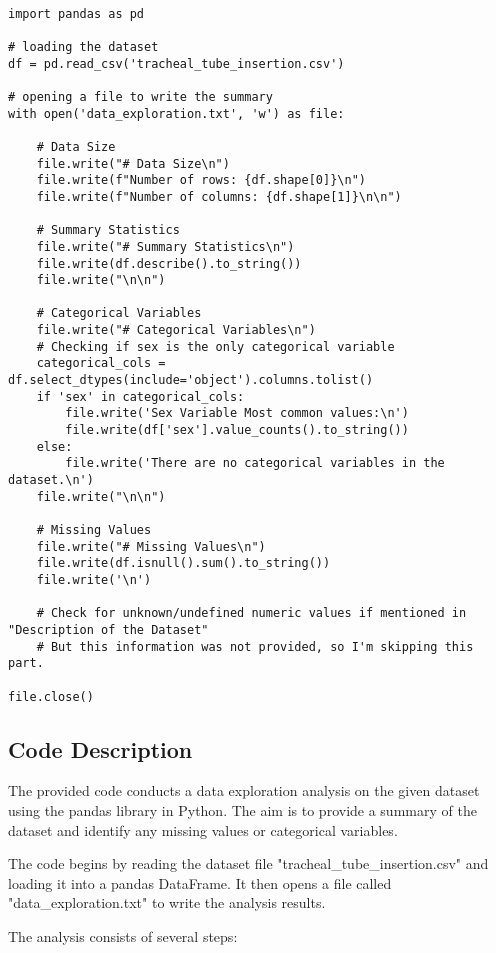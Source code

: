 \documentclass[11pt]{article}
\begin{document}
\begin{verbatim}

import pandas as pd

# loading the dataset
df = pd.read_csv('tracheal_tube_insertion.csv')

# opening a file to write the summary
with open('data_exploration.txt', 'w') as file:

    # Data Size
    file.write("# Data Size\n")
    file.write(f"Number of rows: {df.shape[0]}\n")
    file.write(f"Number of columns: {df.shape[1]}\n\n")

    # Summary Statistics
    file.write("# Summary Statistics\n")
    file.write(df.describe().to_string())
    file.write("\n\n")

    # Categorical Variables
    file.write("# Categorical Variables\n")
    # Checking if sex is the only categorical variable
    categorical_cols = df.select_dtypes(include='object').columns.tolist()
    if 'sex' in categorical_cols:
        file.write('Sex Variable Most common values:\n')
        file.write(df['sex'].value_counts().to_string())
    else: 
        file.write('There are no categorical variables in the dataset.\n')
    file.write("\n\n")
    
    # Missing Values
    file.write("# Missing Values\n")
    file.write(df.isnull().sum().to_string())
    file.write('\n')
    
    # Check for unknown/undefined numeric values if mentioned in "Description of the Dataset"
    # But this information was not provided, so I'm skipping this part.
    
file.close()

\end{verbatim}

\subsection{Code Description}

The provided code conducts a data exploration analysis on the given dataset using the pandas library in Python. The aim is to provide a summary of the dataset and identify any missing values or categorical variables.

The code begins by reading the dataset file "tracheal\_tube\_insertion.csv" and loading it into a pandas DataFrame. It then opens a file called "data\_exploration.txt" to write the analysis results.

The analysis consists of several steps:
\end{document}
